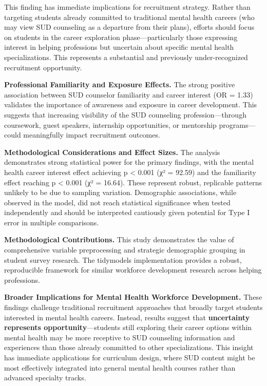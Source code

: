 \documentclass[
  man,
  longtable,
  nolmodern,
  notxfonts,
  notimes,
  colorlinks=true,linkcolor=blue,citecolor=blue,urlcolor=blue]{apa7}
\begin{document}
This finding has immediate implications for recruitment strategy. Rather
than targeting students already committed to traditional mental health
careers (who may view SUD counseling as a departure from their plans),
efforts should focus on students in the career exploration
phase---particularly those expressing interest in helping professions
but uncertain about specific mental health specializations. This
represents a substantial and previously under-recognized recruitment
opportunity.

\textbf{Professional Familiarity and Exposure Effects.} The strong
positive association between SUD counselor familiarity and career
interest (OR = 1.33) validates the importance of awareness and exposure
in career development. This suggests that increasing visibility of the
SUD counseling profession---through coursework, guest speakers,
internship opportunities, or mentorship programs---could meaningfully
impact recruitment outcomes.

\textbf{Methodological Considerations and Effect Sizes.} The analysis
demonstrates strong statistical power for the primary findings, with the
mental health career interest effect achieving p \textless{} 0.001 (χ² =
92.59) and the familiarity effect reaching p \textless{} 0.001 (χ² =
16.64). These represent robust, replicable patterns unlikely to be due
to sampling variation. Demographic associations, while observed in the
model, did not reach statistical significance when tested independently
and should be interpreted cautiously given potential for Type I error in
multiple comparisons.

\textbf{Methodological Contributions.} This study demonstrates the value
of comprehensive variable preprocessing and strategic demographic
grouping in student survey research. The tidymodels implementation
provides a robust, reproducible framework for similar workforce
development research across helping professions.

\textbf{Broader Implications for Mental Health Workforce Development.}
These findings challenge traditional recruitment approaches that broadly
target students interested in mental health careers. Instead, results
suggest that \textbf{uncertainty represents opportunity}---students
still exploring their career options within mental health may be more
receptive to SUD counseling information and experiences than those
already committed to other specializations. This insight has immediate
applications for curriculum design, where SUD content might be most
effectively integrated into general mental health courses rather than
advanced specialty tracks.
\end{document}
